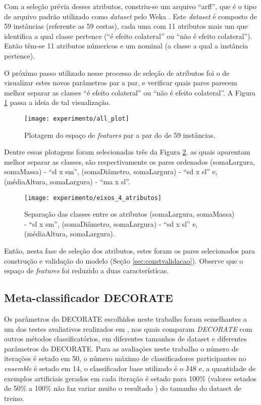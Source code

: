 Com a seleção prévia desses atributos, constriu-se um arquivo ``arff'', que é o tipo de arquivo padrão utilizado como \textit{dataset} pelo Weka \cite{Hall:2009}. Este \textit{dataset} é composto de 59 instâncias (referente as 59 cestas), cada uma com 11 atributos mais um que identifica a qual classe pertence (``é efeito colateral'' ou ``não é efeito colateral''). Então têm-se 11 atributos númericos e um nominal (a classe a qual a instância pertence).

O próximo passo utilizado nesse processo de seleção de atributos foi o de visualizar estes novos parâmetros par a par, e verificar quais pares parecem melhor separar as classes ``é efeito colateral'' ou ``não é efeito colateral''. A Figura \ref{fig:plotall1} passa a ideia de tal visualização. 

\begin{figure}[!htb] \centering 
  \centering
  \texttt{[image: experimento/all\_plot]} 
  \caption{Plotagem do espaço de \textit{features} par a par do  de 59 instâncias.} 
  \label{fig:plotall1}
\end{figure}

Dentre essas plotagens foram selecionadas três da Figura \ref{fig:eixos_4_atributos}, as quais aparentam melhor separar as classes, são respectivamente os pares ordenados (somaLargura, somaMassa) - ``sl x sm'', (somaDiâmetro, somaLargura) - ``sd x sl'' e, (médiaAltura, somaLargura) - ``ma x sl''.

\begin{figure}[!htb] \centering 
  \centering
  \texttt{[image: experimento/eixos\_4\_atributos]} 
  \caption{Separação das classes entre os atributos (somaLargura, somaMassa) - ``sl x sm'', (somaDiâmetro, somaLargura) - ``sd x sl'' e, (médiaAltura, somaLargura).} 
  \label{fig:eixos_4_atributos}
\end{figure}

Então, nesta fase de seleção dos atributos, estes foram os pares selecionados para construção e validação do modelo (Seção \ref{sec:constvalidacao}). Observe que o espaço de \textit{features} foi reduzido a duas características.

\subsection{Meta-classificador DECORATE}
Os parâmetros do DECORATE escolhidos neste trabalho foram semelhantes a um dos testes avaliativos realizados em \cite{Melville:2004}, nos quais comparam \textit{DECORATE} com outros métodos classificatórios, em diferentes tamanhos de dataset e diferentes parâmetros do DECORATE. Para as avaliações neste trabalho o número de iterações é setado em 50, o número máximo de classificadores participantes no \textit{ensemble} é setado em 14, o classificador base utilizado é o J48 e, a quantidade de exemplos artificiais gerados em cada iteração é setado para 100\% (valores setados de 50\% a 100\% não faz variar muito o resultado \cite{Melville:2004}) do tamanho do dataset de treino.

